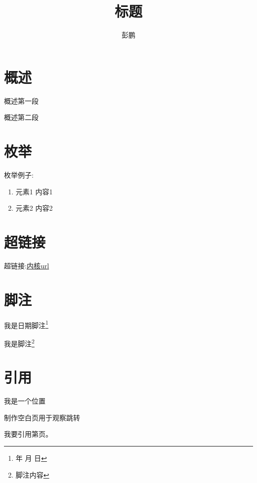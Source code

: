 \documentclass[12pt,a4paper]{article}
\title{标题}
\author{彭鹏}
\renewcommand{\today}{\number\year 年 \number\month 月 \number\day 日}
\begin{document}
\maketitle
\tableofcontents
\newpage

\section{概述}
概述第一段

概述第二段
\section{枚举} 
枚举例子:

\begin{enumerate}
    \item 元素1
        内容1
    \item 元素2
        内容2
\end{enumerate}

\section{超链接} 
超链接:\href{http://ftp.kernel.org/pub/linux/kernel/v3.x/}{内核url}

\section{脚注} 
我是日期脚注\footnote{\today}

我是脚注\footnote{脚注内容}

\section{引用} 
我是一个位置\label{标签1}

制作空白页用于观察跳转
\newpage

我要引用第\pageref{标签1}页。
\end{document}

